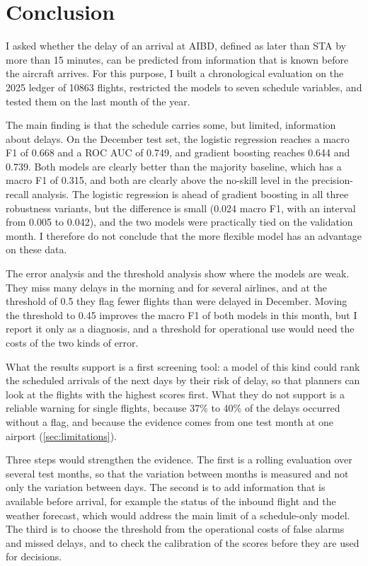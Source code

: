 \section{Conclusion}\label{sec:conclusion}

I asked whether the delay of an arrival at AIBD, defined as \blockon{} later than STA by more than 15 minutes, can be predicted from information that is known before the aircraft arrives. For this purpose, I built a chronological evaluation on the 2025 ledger of \num{10863} flights, restricted the models to seven schedule variables, and tested them on the last month of the year.

The main finding is that the schedule carries some, but limited, information about delays. On the December test set, the logistic regression reaches a macro F1 of 0.668 and a ROC AUC of 0.749, and gradient boosting reaches 0.644 and 0.739. Both models are clearly better than the majority baseline, which has a macro F1 of 0.315, and both are clearly above the no-skill level in the precision-recall analysis. The logistic regression is ahead of gradient boosting in all three robustness variants, but the difference is small (0.024 macro F1, with an interval from 0.005 to 0.042), and the two models were practically tied on the validation month. I therefore do not conclude that the more flexible model has an advantage on these data.

The error analysis and the threshold analysis show where the models are weak. They miss many delays in the morning and for several airlines, and at the threshold of 0.5 they flag fewer flights than were delayed in December. Moving the threshold to 0.45 improves the macro F1 of both models in this month, but I report it only as a diagnosis, and a threshold for operational use would need the costs of the two kinds of error.

What the results support is a first screening tool: a model of this kind could rank the scheduled arrivals of the next days by their risk of delay, so that planners can look at the flights with the highest scores first. What they do not support is a reliable warning for single flights, because 37\% to 40\% of the delays occurred without a flag, and because the evidence comes from one test month at one airport (\cref{sec:limitations}).

Three steps would strengthen the evidence. The first is a rolling evaluation over several test months, so that the variation between months is measured and not only the variation between days. The second is to add information that is available before arrival, for example the status of the inbound flight and the weather forecast, which would address the main limit of a schedule-only model. The third is to choose the threshold from the operational costs of false alarms and missed delays, and to check the calibration of the scores before they are used for decisions.

